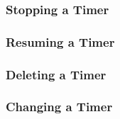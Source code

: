 \subsubsection{Stopping a Timer}

\subsubsection{Resuming a Timer}

\subsubsection{Deleting a Timer}

\subsubsection{Changing a Timer}


